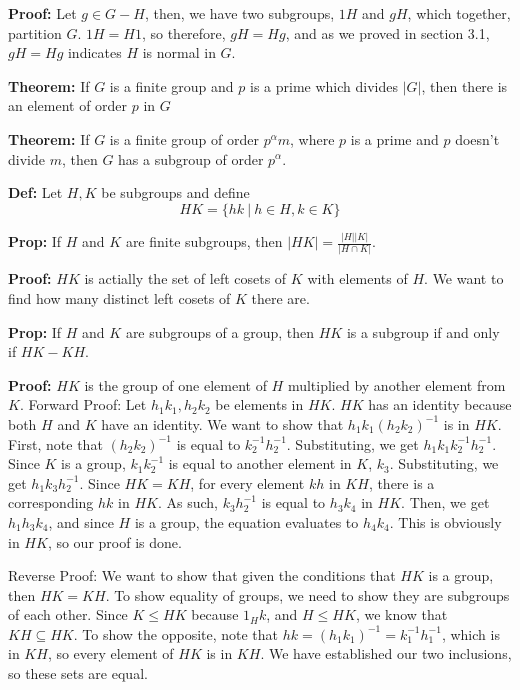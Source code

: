 \documentclass{article}
\begin{document}
\textbf{Proof:} Let $g \in G-H$, then, we have two subgroups, $1H$ and $gH$, which together, partition $G$. $1H = H1$, so therefore, $gH = Hg$, and as we proved in section 3.1, $gH = Hg$ indicates $H$ is normal in $G$. 

\textbf{Theorem:} If $G$ is a finite group and $p$ is a prime which divides $\vert G \vert$, then there is an element of order $p$ in $G$

\textbf{Theorem:} If $G$ is a finite group of order $p^\alpha m$, where $p$ is a prime and $p$ doesn't divide $m$, then $G$ has a subgroup of order $p^\alpha$. 

\textbf{Def:} Let $H,K$ be subgroups and define $$HK = \{hk \ \vert\ h \in H, k\in K \}$$

\textbf{Prop:} If $H$ and $K$ are finite subgroups, then $\vert HK \vert = \frac{\vert H \vert \vert K \vert}{\vert H \cap K\vert}$.

\textbf{Proof:} $HK$ is actially the set of left cosets of $K$ with elements of $H$. We want to find how many distinct left cosets of $K$ there are. 

\textbf{Prop:} If $H$ and $K$ are subgroups of a group, then $HK$ is a subgroup if and only if $HK - KH$.

\textbf{Proof:} $HK$ is the group of one element of $H$ multiplied by another element from $K$. Forward Proof: Let $h_1k_1, h_2k_2$ be elements in $HK$. $HK$ has an identity because both $H$ and $K$ have an identity. We want to show that $h_1k_1(h_2k_2) ^{-1} $ is in $HK$. First, note that $(h_2k_2) ^{-1} $ is equal to $k_2 ^{-1} h_2 ^{-1}$. Substituting, we get $h_1k_1k_2 ^{-1} h_2 ^{-1}$. Since $K$ is a group, $k_1 k_2 ^{-1} $ is equal to another element in $K$, $k_3$. Substituting, we get $h_1 k_3 h_2 ^{-1}$. Since $HK = KH$, for every element $kh$ in $KH$, there is a corresponding $hk$ in $HK$. As such, $k_3 h_2 ^{-1} $ is equal to $h_3 k_4$ in $HK$. Then, we get $h_1 h_3 k_4$, and since $H$ is a group, the equation evaluates to $h_4 k_4$. This is obviously in $HK$, so our proof is done. 

Reverse Proof: We want to show that given the conditions that $HK$ is a group, then $HK = KH$. To show equality of groups, we need to show they are subgroups of each other. Since $K \leq HK$ because $1_H k$, and $H \leq HK$, we know that $KH \subseteq HK$. To show the opposite, note that $hk = (h_1 k_1) ^{-1}  =  k_1 ^{-1} h_1 ^{-1}$, which is in $KH$, so every element of $HK$ is in $KH$. We have established our two inclusions, so these sets are equal. 
\end{document}
